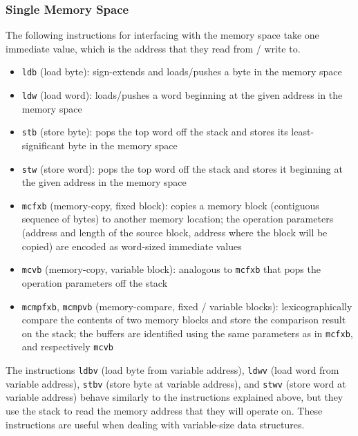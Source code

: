 \subsubsection{Single Memory Space}
The following instructions for interfacing with the memory space take one
immediate value, which is the address that they read from / write to.
\begin{itemize}
  \item \texttt{ldb} (load byte): sign-extends and loads/pushes a byte in the
  memory space
  \item \texttt{ldw} (load word): loads/pushes a word beginning at the
  given address in the memory space
  \item \texttt{stb} (store byte): pops the top word off the stack and stores 
  its least-significant byte in the memory space
  \item \texttt{stw} (store word): pops the top word off the stack and stores
  it beginning at the given address in the memory space
  \item \texttt{mcfxb} (memory-copy, fixed block): copies a memory block
  (contiguous sequence of bytes) to another memory location; the operation
  parameters (address and length of the source block, address where the block
  will be copied) are encoded as word-sized immediate values
  \item \texttt{mcvb} (memory-copy, variable block): analogous to
  \texttt{mcfxb} that pops the operation parameters off the stack
  \item \texttt{mcmpfxb}, \texttt{mcmpvb} (memory-compare, fixed /
  variable blocks): lexicographically compare the contents of two memory blocks
  and store the comparison result on the stack; the buffers are identified
  using the same parameters as in \texttt{mcfxb}, and respectively \texttt{mcvb}
\end{itemize}

The instructions \texttt{ldbv} (load byte from variable address), \texttt{ldwv}
(load word from variable address), \texttt{stbv} (store byte at variable
address), and \texttt{stwv} (store word at variable address) behave similarly
to the instructions explained above, but they use the stack to read the
memory address that they will operate on. These instructions are useful when
dealing with variable-size data structures.

